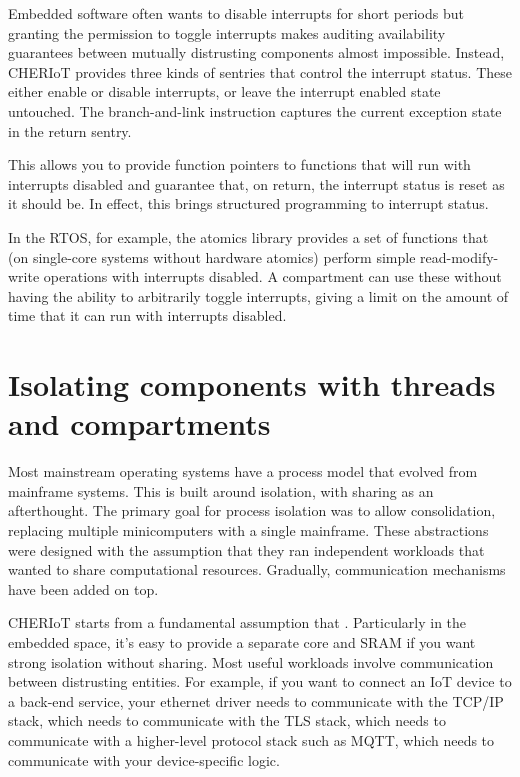 Embedded software often wants to disable interrupts for short periods but granting the permission to toggle interrupts makes auditing availability guarantees between mutually distrusting components almost impossible.
Instead, CHERIoT provides three kinds of sentries that control the interrupt status.
These either enable or disable interrupts, or leave the interrupt enabled state untouched.
The branch-and-link instruction captures the current exception state in the return sentry.

This allows you to provide function pointers to functions that will run with interrupts disabled and guarantee that, on return, the interrupt status is reset as it should be.
In effect, this brings structured programming to interrupt status.

In the RTOS, for example, the atomics library provides a set of functions that (on single-core systems without hardware atomics) perform simple read-modify-write operations with interrupts disabled.
A compartment can use these without having the ability to arbitrarily toggle interrupts, giving a limit on the amount of time that it can run with interrupts disabled.

\section{Isolating components with threads and compartments}

Most mainstream operating systems have a process model that evolved from mainframe systems.
This is built around isolation, with sharing as an afterthought.
The primary goal for process isolation was to allow consolidation, replacing multiple minicomputers with a single mainframe.
These abstractions were designed with the assumption that they ran independent workloads that wanted to share computational resources.
Gradually, communication mechanisms have been added on top.

CHERIoT starts from a fundamental assumption that .
Particularly in the embedded space, it's easy to provide a separate core and SRAM if you want strong isolation without sharing.
Most useful workloads involve communication between distrusting entities.
For example, if you want to connect an IoT device to a back-end service, your ethernet driver needs to communicate with the TCP/IP stack, which needs to communicate with the TLS stack, which needs to communicate with a higher-level protocol stack such as MQTT, which needs to communicate with your device-specific logic.

